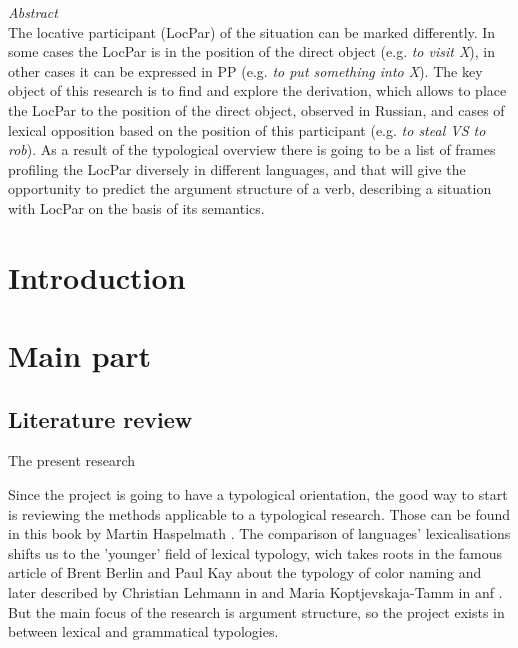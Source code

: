 
\usepackage{alltt}
\usepackage{bibunits}
\usepackage{enumitem}
\usepackage{ltablex,booktabs}



\begin{changemargin}{2.5cm}{0.5cm}
\textit{Abstract}\\


The locative participant (LocPar) of the situation can be marked differently. In some cases the LocPar is in the position of the direct object (e.g. \textit{to visit X}), in other cases it can be expressed in PP (e.g. \textit{to put something into X}). The key object of this research is to find and explore the derivation, which allows to place the LocPar to the position of the direct object, observed in Russian, and cases of lexical opposition based on the position of this participant (e.g. \textit{to steal VS to rob}). As a result of the typological overview there is going to be a list of frames profiling the LocPar diversely in different languages, and that will give the opportunity to predict the argument structure of a verb, describing a situation with LocPar on the basis of its semantics.
\end{changemargin}
\normalsize




\section{Introduction} 


\section{Main part}
\subsection{Literature review}
The present research 

Since the project is going to have a typological orientation, the good way to start is reviewing the methods applicable to a typological research. Those can be found in this book by Martin Haspelmath \citep{haspelmath2001language}. The comparison of languages' lexicalisations shifts us to the 'younger' field of lexical typology, wich takes roots in the famous article of Brent Berlin and Paul Kay about the typology of color naming \citep{berlin1991basic} and later described by Christian Lehmann in \citep{lehmann1990towards} and Maria Koptjevskaja-Tamm in \citep{koptjevskaja2008approaching} anf \citep{krv2015}. But the main focus of the research is argument structure, so the project exists in between lexical and grammatical typologies.

